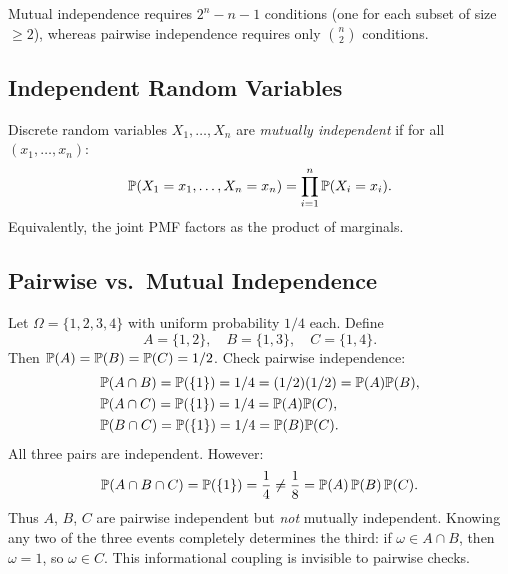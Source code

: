 \documentclass[11pt,a4paper]{article}
\begin{document}
\begin{remark}
Mutual independence requires $2^n - n - 1$ conditions (one for
each subset of size $\geq 2$), whereas pairwise independence
requires only $\binom{n}{2}$ conditions.
\end{remark}

\subsection{Independent Random Variables}
\label{subsec:indep_rv}

\begin{definition}
\label{def:indep_rv}
Discrete random variables $X_1, \ldots, X_n$ are
\emph{mutually independent} if for all
$(x_1, \ldots, x_n)$:
\begin{equation}
  \mathbb{P}(X_1 = x_1, \ldots, X_n = x_n)
  = \prod_{i=1}^n \mathbb{P}(X_i = x_i).
  \label{eq:indep_rv}
\end{equation}
Equivalently, the joint PMF factors as the product of marginals.
\end{definition}

\subsection{Pairwise vs.\ Mutual Independence}
\label{subsec:pairwise_vs_mutual}

\begin{example}
\label{ex:pairwise_not_mutual}
Let $\Omega = \{1, 2, 3, 4\}$ with uniform probability $1/4$
each.  Define
\[
  A = \{1, 2\}, \quad B = \{1, 3\}, \quad C = \{1, 4\}.
\]
Then $\mathbb{P}(A) = \mathbb{P}(B) = \mathbb{P}(C) = 1/2$.  Check pairwise
independence:
\begin{align}
  &\mathbb{P}(A \cap B) = \mathbb{P}(\{1\}) = 1/4
    = (1/2)(1/2) = \mathbb{P}(A)\mathbb{P}(B), \nonumber\\
  &\mathbb{P}(A \cap C) = \mathbb{P}(\{1\}) = 1/4
    = \mathbb{P}(A)\mathbb{P}(C), \nonumber\\
  &\mathbb{P}(B \cap C) = \mathbb{P}(\{1\}) = 1/4
    = \mathbb{P}(B)\mathbb{P}(C).
  \label{eq:pairwise_ok}
\end{align}
All three pairs are independent.  However:
\begin{equation}
  \mathbb{P}(A \cap B \cap C) = \mathbb{P}(\{1\}) = \frac{1}{4}
  \neq \frac{1}{8}
  = \mathbb{P}(A)\, \mathbb{P}(B)\, \mathbb{P}(C).
  \label{eq:mutual_fail}
\end{equation}
Thus $A$, $B$, $C$ are pairwise independent but \emph{not}
mutually independent.  Knowing any two of the three events
completely determines the third: if $\omega \in A \cap B$, then
$\omega = 1$, so $\omega \in C$.  This informational coupling is
invisible to pairwise checks.
\end{example}
\end{document}
